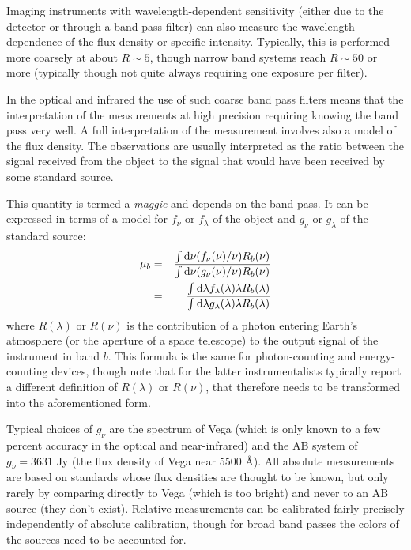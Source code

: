 Imaging instruments with wavelength-dependent sensitivity (either due
to the detector or through a band pass filter) can also measure the
wavelength dependence of the flux density or specific
intensity. Typically, this is performed more coarsely at about $R\sim
5$, though narrow band systems reach $R\sim 50$ or more (typically
though not quite always requiring one exposure per filter).

In the optical and infrared the use of such coarse band pass filters
means that the interpretation of the measurements at high precision
requiring knowing the band pass very well. A full interpretation of
the measurement involves also a model of the flux density. The
observations are usually interpreted as the ratio between the signal
received from the object to the signal that would have been received
by some standard source.

This quantity is termed a {\it maggie} and depends on the band
pass. It can be expressed in terms of a model for $f_\nu$ or
$f_\lambda$ of the object and $g_\nu$ or $g_\lambda$ of the standard
source:
\begin{eqnarray}
  \mu_b &=&
  \frac{\int {\rm d}\nu (f_\nu(\nu)/\nu) R_b(\nu)}
       {\int {\rm d}\nu (g_\nu(\nu)/\nu) R_b(\nu)} \cr
       &=&
  \frac{\int {\rm d}\lambda f_\lambda(\lambda) \lambda R_b(\lambda) }
       {\int {\rm d}\lambda g_\lambda(\lambda) \lambda R_b(\lambda)} 
\end{eqnarray}
where $R(\lambda)$ or $R(\nu)$ is the contribution of a photon
entering Earth's atmosphere (or the aperture of a space telescope) to
the output signal of the instrument in band $b$. This formula is the
same for photon-counting and energy-counting devices, though note that
for the latter instrumentalists typically report a different
definition of $R(\lambda)$ or $R(\nu)$, that therefore needs to be
transformed into the aforementioned form.

Typical choices of $g_\nu$ are the spectrum of Vega (which is only
known to a few percent accuracy in the optical and near-infrared) and
the AB system of $g_\nu = 3631$ Jy (the flux density of Vega near 5500
\AA).  All absolute measurements are based on standards whose flux
densities are thought to be known, but only rarely by comparing
directly to Vega (which is too bright) and never to an AB source (they
don't exist). Relative measurements can be calibrated fairly precisely
independently of absolute calibration, though for broad band passes
the colors of the sources need to be accounted for.

